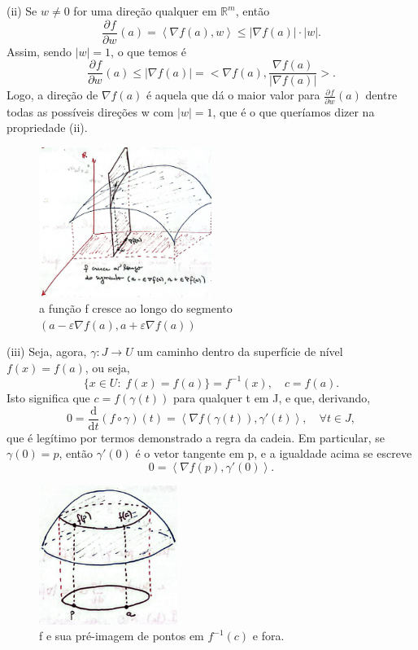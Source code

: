 \documentclass[../analysisII_notes.tex]{subfiles}
\begin{document}
\begin{proof*}
	(ii) Se \(w\neq 0\) for uma direção qualquer em \(\mathbb{R}^{m}\), então
	\[
		\frac{\partial^{}f}{\partial w^{}}(a) = \left< \nabla f(a), w \right> \leq |\nabla f(a)|\cdot |w|.
	\]
	Assim, sendo \(|w| = 1\), o que temos é
	\[
		\frac{\partial^{}f}{\partial w^{}}(a) \leq |\nabla f(a)| = \biggl< \nabla f(a), \frac{\nabla f(a)}{|\nabla f(a)|} \biggr>.
	\]
	Logo, a direção de \(\nabla f(a)\) é aquela que dá o maior valor para \(\frac{\partial^{}f}{\partial w^{}}(a)\) dentre todas as possíveis direções w com \(|w|=1\), que é o que queríamos dizer na propriedade (ii).
	\begin{figure}[H]
		\begin{center}
			\includegraphics[height=0.5\textheight, width=0.5\textwidth, keepaspectratio]{./Images/growth_f_25.png}
		\end{center}
		\caption{a função f cresce ao longo do segmento \((a-\varepsilon \nabla f(a), a+\varepsilon \nabla f(a))\)}
	\end{figure}

	(iii) Seja, agora, \(\gamma :J\rightarrow U\) um caminho dentro da superfície de nível \(f(x) = f(a)\), ou seja,
	\[
		\{x\in U:\; f(x) = f(a)\} = f^{-1}(x),\quad c = f(a).
	\]
	Isto significa que \(c = f(\gamma (t))\) para qualquer t em J, e que, derivando,
	\[
		0 = \frac{\mathrm{d}}{\mathrm{d}t}(f\circ \gamma )(t) = \left< \nabla f(\gamma (t)),\gamma'(t)  \right>,\quad \forall t\in J,
	\]
	que é legítimo por termos demonstrado a regra da cadeia. Em particular, se \(\gamma (0) = p\), então \(\gamma'(0)\) é o vetor tangente em p, e a igualdade acima se escreve
	\[
		0 = \left< \nabla f(p), \gamma '(0) \right>.
	\]
	\begin{figure}[H]
		\begin{center}
			\includegraphics[height=0.4\textheight, width=0.4\textwidth, keepaspectratio]{./Images/level_surface_25.png}
		\end{center}
		\caption{f e sua pré-imagem de pontos em \(f^{-1}(c)\) e fora.}
	\end{figure}


\end{proof*}
\end{document}
